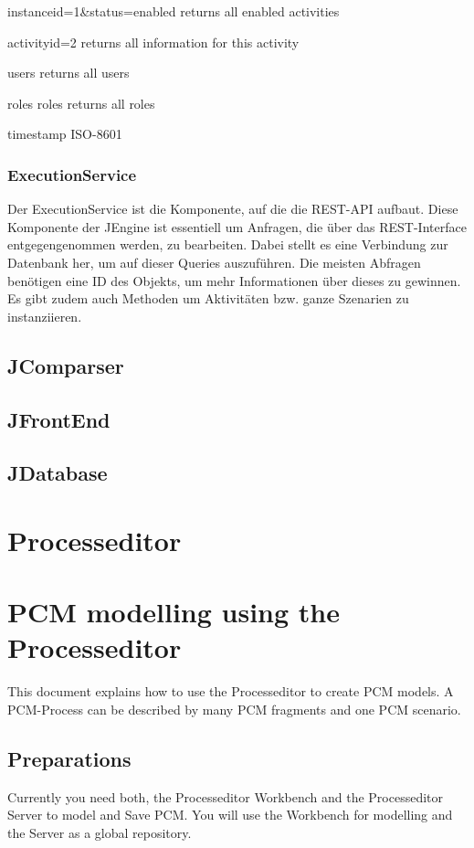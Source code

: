\documentclass{template/ecsreport}      %
\begin{document}
instanceid=1&status=enabled
returns all enabled activities

activityid=2
returns all information for this activity

users
returns all users

roles
roles returns all roles


timestamp ISO-8601

%
%
\subsubsection{ExecutionService}
Der ExecutionService ist die Komponente, auf die die REST-API aufbaut. Diese Komponente der JEngine ist essentiell um Anfragen, die über das REST-Interface entgegengenommen werden, zu bearbeiten. Dabei stellt es eine Verbindung zur Datenbank her, um auf dieser Queries auszuführen. Die meisten Abfragen benötigen eine ID des Objekts, um mehr Informationen über dieses zu gewinnen. Es gibt zudem auch Methoden um Aktivitäten bzw. ganze Szenarien zu instanziieren.

%
%
\subsection{JComparser}

%
%
\subsection{JFrontEnd}

%
%
\subsection{JDatabase}

%
%
\section{Processeditor}

%
%
\section{PCM modelling using the Processeditor}\label{pcm-modelling-using-the-processeditor}
This document explains how to use the Processeditor to create PCM
models. A PCM-Process can be described by many PCM fragments and one PCM
scenario.

%
%
\subsection{Preparations}\label{preparations}
Currently you need both, the Processeditor Workbench and the
Processeditor Server to model and Save PCM. You will use the Workbench
for modelling and the Server as a global repository.
\end{document}
